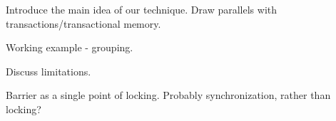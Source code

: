 
\label {fs-optimistic}

Introduce the main idea of our technique. Draw parallels with transactions/transactional memory. 

Working example - grouping. 

Discuss limitations.

Barrier as a single point of locking.  Probably synchronization, rather than locking?